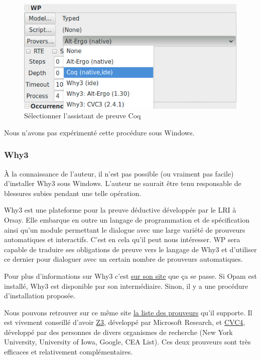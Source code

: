 \documentclass[12pt,francais,]{scrbook}
\newenvironment{zdsalertblock}[1]{%
  \tcolorbox[beamer,%
    noparskip,breakable,
    colback=LightCoral,colframe=DarkRed,%
    colbacklower=Tomato,%
    title=#1]
}{\endtcolorbox}
\newenvironment{zdsblock}[1]{%
  \tcolorbox[beamer,%
    noparskip,breakable,
    colback=LightBlue,colframe=DarkBlue,%
    colbacklower=DarkBlue,%
    title=#1]
}{\endtcolorbox}
\begin{document}
\begin{figure}[htbp]
\centering
\includegraphics[scale=0.5]{1-2-select-coq.png}
\caption{Sélectionner l'assistant de preuve Coq}
\label{fig:select-coq}
\end{figure}

\begin{zdsblock}{Information}
  Nous n'avons pas expérimenté cette procédure sous Windows.
\end{zdsblock}
  
\subsubsection{Why3}\label{why3}

\begin{zdsalertblock}{Attention}
  À la connaissance de l'auteur, il n'est
  pas possible (ou vraiment pas facile) d'installer Why3 sous
  Windows. L'auteur ne saurait être tenu responsable de
  blessures subies pendant une telle opération.
\end{zdsalertblock}


Why3 est une plateforme pour la preuve déductive développée par le LRI à
Orsay. Elle embarque en outre un langage de programmation et de
spécification ainsi qu'un module permettant le dialogue avec une large
variété de prouveurs automatiques et interactifs. C'est en cela qu'il
peut nous intéresser. WP sera capable de traduire ses obligations de
preuve vers le langage de Why3 et d'utiliser ce dernier pour dialoguer
avec un certain nombre de prouveurs automatiques.

Pour plus d'informations sur Why3 c'est \href{http://why3.lri.fr/}{sur
son site} que ça se passe. Si Opam est installé, Why3 est disponible par
son intermédiaire. Sinon, il y a une procédure d'installation proposée.

Nous pouvons retrouver sur ce même site
\href{http://why3.lri.fr/\#provers}{la liste des prouveurs} qu'il
supporte. Il est vivement conseillé d'avoir
\href{https://github.com/Z3Prover/z3/wiki}{Z3}, développé par Microsoft
Research, et \href{http://cvc4.cs.nyu.edu/web/}{CVC4}, développé par des
personnes de divers organismes de recherche (New York University,
University of Iowa, Google, CEA List). Ces deux prouveurs sont très
efficaces et relativement complémentaires.
\end{document}
